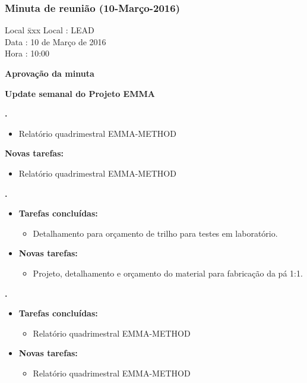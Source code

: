 \subsubsection{Minuta de reunião (10-Março-2016)}

\begin{tabbing}
  Local \= xxx \kill
  Local \> : LEAD \\
  Data  \> : 10 de Março de 2016 \\
  Hora  \> : 10:00
\end{tabbing} 


\textbf{Aprovação da minuta}

\textbf{Update semanal do Projeto EMMA}

						
\textbf{\gabriel.} 
	\begin{itemize}
			\item Relatório quadrimestral EMMA-METHOD
			\end{itemize}
		
		\item \textbf{Novas tarefas:}
			\begin{itemize} 
			\item Relatório quadrimestral EMMA-METHOD
			\end{itemize}

					
   \textbf{.} 
	\begin{itemize}
		\item \textbf{Tarefas concluídas:}
			\begin{itemize}    
			    \item Detalhamento para orçamento de trilho para testes em laboratório.
				
			\end{itemize}
		
		\item \textbf{Novas tarefas:}
			\begin{itemize} 
			    \item Projeto, detalhamento e orçamento do material para fabricação da pá
			    1:1.
			\end{itemize}
	\end{itemize}

	
	  \textbf{\elael.} 
	\begin{itemize}
		\item \textbf{Tarefas concluídas:}
			\begin{itemize}    
			\item Relatório quadrimestral EMMA-METHOD
			\end{itemize}
		
		\item \textbf{Novas tarefas:}
			\begin{itemize} 
				\item Relatório quadrimestral EMMA-METHOD
			\end{itemize}
	\end{itemize}			
			
